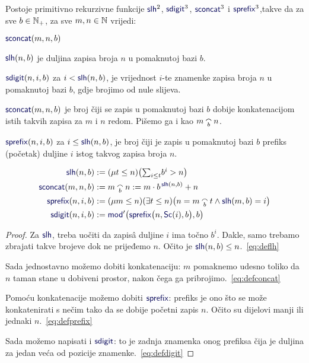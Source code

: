 \begin{lema}[{name=[rad sa zapisima u pomaknutoj bazi]}]\label{lm:ldcpprn}
Postoje primitivno rekurzivne funkcije $\f{slh}^2$, $\f{sdigit}^3$, $\f{sconcat}^3$ i $\f{sprefix}^3$,\newline takve da za sve $b\in{\mathbb N}_+$, za sve $m,n\in{\mathbb N}$ vrijedi:
\begin{labeling}{$\f{sconcat}(m,n,b)$}
    \item[$\f{slh}(n,b)$] je duljina zapisa broja $n$ u pomaknutoj bazi $b$. \item[$\f{sdigit}(n,i,b)$] za $i<\f{slh}(n,b)$, je vrijednost $i$-te znamenke zapisa broja $n$ u pomaknutoj bazi $b$, gdje brojimo od nule slijeva.
    \item[$\f{sconcat}(m,n,b)$] je broj čiji se zapis u pomaknutoj bazi $b$ dobije konkatenacijom istih takvih zapisa za $m$ i $n$ redom. Pišemo ga i kao $m\conc bn$.
    \item[$\f{sprefix}(n,i,b)$] za $i\le\f{slh}(n,b)$, je broj čiji je zapis u pomaknutoj bazi $b$ prefiks (početak) duljine $i$ istog takvog zapisa broja $n$.
\end{labeling}
\end{lema}
\noindent\begin{align}
\label{eq:deflh}
    \f{slh}(n,b)&:=(\mu t\le n)\big(\!
    \textstyle\sum_{i\le t}\!b^i>n
    \big)\\
\label{eq:defconcat}
    \f{sconcat}(m,n,b)&:=m\conc bn:=m\cdot b^{\,\f{slh}(n,b)}+n\\
\label{eq:defprefix}
    \f{sprefix}(n,i,b)&:=(\mu m\le n)(\exists t\le n)\bigl(n=m\conc bt\land\f{slh}(m,b)=i\bigr)\\
\label{eq:defdigit}
    \f{sdigit}(n,i,b)&:=\f{mod}'\bigl(\f{sprefix}\bigl(n,\f{Sc}(i),b\bigr),b\bigr)
\end{align}
\begin{proof}
Za $\f{slh}$, treba uočiti da zapisâ duljine $i$ ima točno $b^i$. Dakle, samo trebamo zbrajati takve brojeve dok ne prijeđemo $n$. Očito je $\f{slh}(n,b)\le n$.~\eqref{eq:deflh}

Sada jednostavno možemo dobiti konkatenaciju: $m$ pomaknemo udesno toliko da $n$ taman stane u dobiveni prostor, nakon čega ga pribrojimo.~\eqref{eq:defconcat}

Pomoću konkatenacije možemo dobiti $\f{sprefix}$: prefiks je ono što se može konkatenirati s nečim tako da se dobije početni zapis $n$. Očito su dijelovi manji ili jednaki $n$.~\eqref{eq:defprefix} %

Sada možemo napisati i $\f{sdigit}$: to je zadnja znamenka onog prefiksa čija je duljina za jedan veća od pozicije znamenke.~\eqref{eq:defdigit}
\end{proof}

